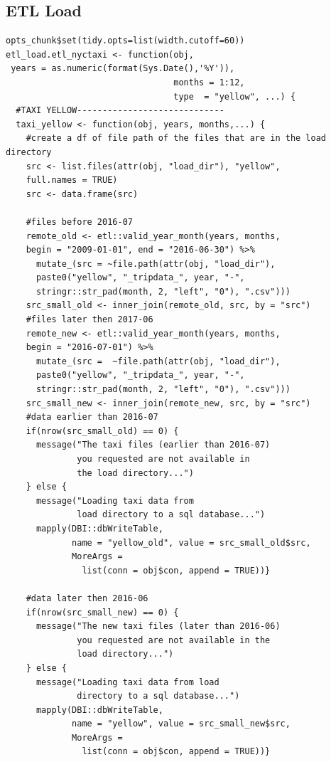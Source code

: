 \documentclass[12pt,twoside]{reedthesis}
\theoremstyle{definition}
\theoremstyle{definition}
\theoremstyle{definition}
\theoremstyle{remark}
\begin{document}
\subsection{ETL Load}\label{etl-load}
\begin{verbatim}
opts_chunk$set(tidy.opts=list(width.cutoff=60))
etl_load.etl_nyctaxi <- function(obj, 
 years = as.numeric(format(Sys.Date(),'%Y')), 
                                 months = 1:12, 
                                 type  = "yellow", ...) {
  #TAXI YELLOW-----------------------------
  taxi_yellow <- function(obj, years, months,...) {
    #create a df of file path of the files that are in the load directory
    src <- list.files(attr(obj, "load_dir"), "yellow", 
    full.names = TRUE)
    src <- data.frame(src)
    
    #files before 2016-07
    remote_old <- etl::valid_year_month(years, months, 
    begin = "2009-01-01", end = "2016-06-30") %>%
      mutate_(src = ~file.path(attr(obj, "load_dir"), 
      paste0("yellow", "_tripdata_", year, "-",
      stringr::str_pad(month, 2, "left", "0"), ".csv"))) 
    src_small_old <- inner_join(remote_old, src, by = "src")
    #files later then 2017-06
    remote_new <- etl::valid_year_month(years, months, 
    begin = "2016-07-01") %>%
      mutate_(src =  ~file.path(attr(obj, "load_dir"), 
      paste0("yellow", "_tripdata_", year, "-",
      stringr::str_pad(month, 2, "left", "0"), ".csv"))) 
    src_small_new <- inner_join(remote_new, src, by = "src")
    #data earlier than 2016-07
    if(nrow(src_small_old) == 0) {
      message("The taxi files (earlier than 2016-07) 
              you requested are not available in 
              the load directory...")
    } else {
      message("Loading taxi data from 
              load directory to a sql database...")
      mapply(DBI::dbWriteTable, 
             name = "yellow_old", value = src_small_old$src, 
             MoreArgs = 
               list(conn = obj$con, append = TRUE))}
    
    #data later then 2016-06
    if(nrow(src_small_new) == 0) {
      message("The new taxi files (later than 2016-06) 
              you requested are not available in the 
              load directory...")
    } else {
      message("Loading taxi data from load 
              directory to a sql database...")
      mapply(DBI::dbWriteTable, 
             name = "yellow", value = src_small_new$src, 
             MoreArgs = 
               list(conn = obj$con, append = TRUE))}
    

\end{verbatim}
\end{document}
